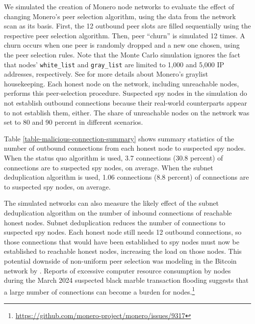 \documentclass[english]{mrl}
\theoremstyle{plain}
\begin{document}
We simulated the creation of Monero node networks to evaluate the
effect of changing Monero's peer selection algorithm, using the data
from the network scan as its basis. First, the 12 outbound peer slots
are filled sequentially using the respective peer selection algorithm.
Then, peer ``churn'' is simulated 12 times. A churn occurs when
one peer is randomly dropped and a new one chosen, using the peer
selection rules. Note that the Monte Carlo simulation ignores the
fact that nodes' \texttt{white\_list} and \texttt{gray\_list} are
limited to 1,000 and 5,000 IP addresses, respectively. See \cite{Cao2020}
for more details about Monero's graylist housekeeping. Each honest
node on the network, including unreachable nodes, performs this peer-selection
procedure. Suspected spy nodes in the simulation do not establish
outbound connections because their real-world counterparts appear
to not establish them, either. The share of unreachable nodes on the
network was set to 80 and 90 percent in different scenarios.







Table \ref{table-malicious-connection-summary} shows summary statistics
of the number of outbound connections from each honest node to suspected
spy nodes. When the status quo algorithm is used, 3.7 connections
(30.8 percent) of connections are to suspected spy nodes, on average.
When the subnet deduplication algorithm is used, 1.06 connections
(8.8 percent) of connections are to suspected spy nodes, on average.

The simulated networks can also measure the likely effect of the subnet
deduplication algorithm on the number of inbound connections of reachable
honest nodes. Subnet deduplication reduces the number of connections
to suspected spy nodes. Each honest node still needs 12 outbound connections,
so those connections that would have been established to spy nodes
must now be established to reachable honest nodes, increasing the
load on those nodes. This potential downside of non-uniform peer selection
was modeling in the Bitcoin network by \cite{virtu2023}. Reports
of excessive computer resource consumption by nodes during the March
2024 suspected black marble transaction flooding suggests that a large
number of connections can become a burden for nodes.\footnote{\href{https://github.com/monero-project/monero/issues/9317}{https://github.com/monero-project/monero/issues/9317}}
\end{document}
